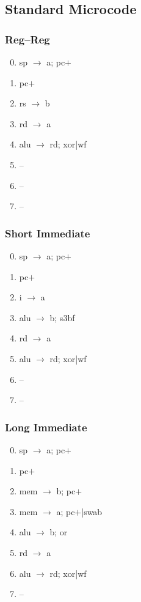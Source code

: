 \documentclass[11pt]{book}
\begin{document}
\subsection*{Standard Microcode}
\begin{multicols}{3}\ttfamily\selectfont\small
  \subsubsection*{Reg--Reg}
  \begin{enumerate}\setcounter{enumi}{-1}
  \item sp \(\rightarrow\) a; pc\(+\)
  \item pc\(+\)
  \item rs \(\rightarrow\) b
  \item rd \(\rightarrow\) a
  \item alu \(\rightarrow\) rd; xor|wf
  \item --
  \item --
  \item --
  \end{enumerate}
  \columnbreak
  \subsubsection*{Short Immediate}
  \begin{enumerate}\setcounter{enumi}{-1}
  \item sp \(\rightarrow\) a; pc\(+\)
  \item pc\(+\)
  \item i \(\rightarrow\) a
  \item alu \(\rightarrow\) b; s3bf
  \item rd \(\rightarrow\) a
  \item alu \(\rightarrow\) rd; xor|wf
  \item --
  \item --
  \end{enumerate}
  \columnbreak
  \subsubsection*{Long Immediate}
  \begin{enumerate}\setcounter{enumi}{-1}
  \item sp \(\rightarrow\) a; pc\(+\)
  \item pc\(+\)
  \item mem \(\rightarrow\) b; pc\(+\)
  \item mem \(\rightarrow\) a; pc\(+\)|swab
  \item alu \(\rightarrow\) b; or
  \item rd \(\rightarrow\) a
  \item alu \(\rightarrow\) rd; xor|wf
  \item --
  \end{enumerate}
\end{multicols}
\end{document}
